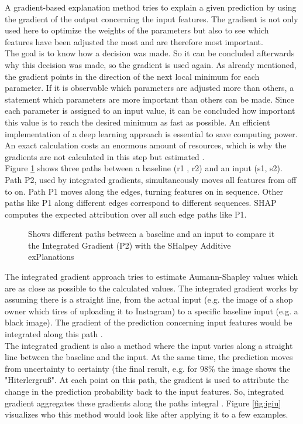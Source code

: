 A gradient-based explanation method tries to explain a given prediction by using the gradient of the output concerning the input features. The gradient is not only used here to optimize the weights of the parameters but also to see which features have been adjusted the most and are therefore most important. \\

The goal is to know how a decision was made. So it can be concluded afterwards why this decision was made, so the gradient is used again. As already mentioned, the gradient points in the direction of the next local minimum for each parameter. If it is observable which parameters are adjusted more than others, a statement which parameters are more important than others can be made. Since each parameter is assigned to an input value, it can be concluded how important this value is to reach the desired minimum as fast as possible. An efficient implementation of a deep learning approach is essential to save computing power. An exact calculation costs an enormous amount of resources, which is why the gradients are not calculated in this step but estimated \cite{molnar2019} \cite{TjoaGuan} \cite{Mukund}.\\

Figure \ref{fig:ig} shows three paths between a baseline (r1 , r2) and an input (s1, s2). Path P2, used by integrated gradients, simultaneously moves all features from off to on. Path P1 moves along the edges, turning features on in sequence. Other paths like P1 along different edges correspond to different sequences. SHAP computes the expected attribution over all such edge paths like P1.\\

\begin{figure}[htp]
	\centering
	\caption{Shows different paths between a baseline and an input to compare it the Integrated Gradient (P2) with the SHalpey Additive exPlanations\cite{TjoaGuan}}
	\label{fig:ig}
\end{figure}

The integrated gradient approach tries to estimate Aumann-Shapley values which are as close as possible to the calculated values. The integrated gradient works by assuming there is a straight line, from the actual input (e.g. the image of a shop owner which tires of uploading it to Instagram) to a specific baseline input (e.g. a black image). The gradient of the prediction concerning input features would be integrated along this path \cite{Mukund}.\\
The integrated gradient is also a method where the input varies along a straight line between the baseline and the input. At the same time, the prediction moves from uncertainty to certainty (the final result, e.g. for 98\% the image shows the "Hiterlergruß". At each point on this path, the gradient is used to attribute the change in the prediction probability back to the input features. So, integrated gradient aggregates these gradients along the paths integral \cite{mudrakarta-etal-2018-model}.
Figure \ref{fig:igiu} visualizes who this method would look like after applying it to a few examples.

